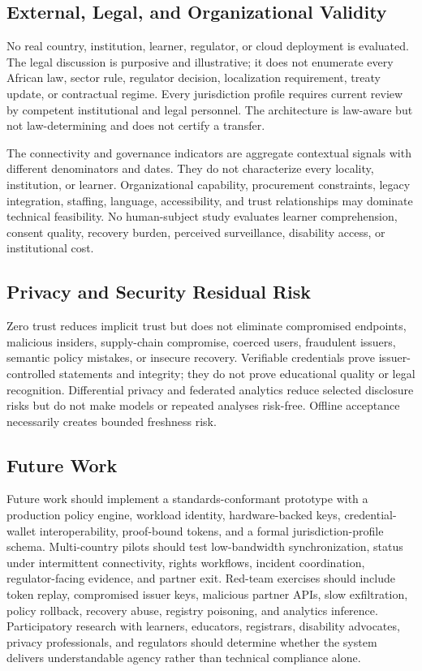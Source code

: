 \documentclass[journal]{IEEEtran}
\begin{document}
\subsection{External, Legal, and Organizational Validity}
No real country, institution, learner, regulator, or cloud deployment is evaluated. The legal discussion is purposive and illustrative; it does not enumerate every African law, sector rule, regulator decision, localization requirement, treaty update, or contractual regime. Every jurisdiction profile requires current review by competent institutional and legal personnel. The architecture is law-aware but not law-determining and does not certify a transfer.

The connectivity and governance indicators are aggregate contextual signals with different denominators and dates. They do not characterize every locality, institution, or learner. Organizational capability, procurement constraints, legacy integration, staffing, language, accessibility, and trust relationships may dominate technical feasibility. No human-subject study evaluates learner comprehension, consent quality, recovery burden, perceived surveillance, disability access, or institutional cost.

\subsection{Privacy and Security Residual Risk}
Zero trust reduces implicit trust but does not eliminate compromised endpoints, malicious insiders, supply-chain compromise, coerced users, fraudulent issuers, semantic policy mistakes, or insecure recovery. Verifiable credentials prove issuer-controlled statements and integrity; they do not prove educational quality or legal recognition. Differential privacy and federated analytics reduce selected disclosure risks but do not make models or repeated analyses risk-free. Offline acceptance necessarily creates bounded freshness risk.

\subsection{Future Work}
Future work should implement a standards-conformant prototype with a production policy engine, workload identity, hardware-backed keys, credential-wallet interoperability, proof-bound tokens, and a formal jurisdiction-profile schema. Multi-country pilots should test low-bandwidth synchronization, status under intermittent connectivity, rights workflows, incident coordination, regulator-facing evidence, and partner exit. Red-team exercises should include token replay, compromised issuer keys, malicious partner APIs, slow exfiltration, policy rollback, recovery abuse, registry poisoning, and analytics inference. Participatory research with learners, educators, registrars, disability advocates, privacy professionals, and regulators should determine whether the system delivers understandable agency rather than technical compliance alone.
\end{document}
